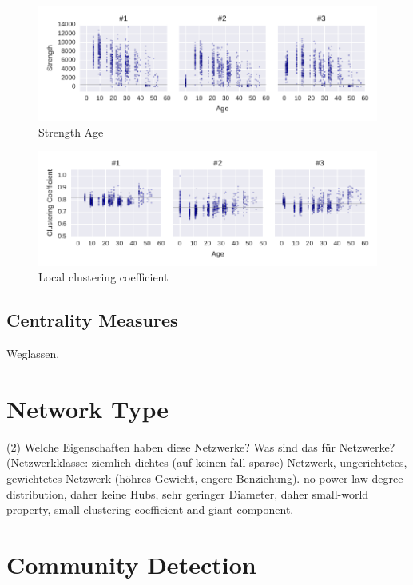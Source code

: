 \begin{figure}[htb]
	\centering
	\includegraphics[width=1.0\textwidth]{Figures/stat-strengthAge}
	\caption[Strength Age]{Strength Age}
	\label{fig:strengthAge}
\end{figure}	


\begin{figure}[htb]
	\centering
	\includegraphics[width=1.0\textwidth]{Figures/stat-ccAge}
	\caption[Local clustering coefficient]{Local clustering coefficient}
	\label{fig:ccAge}
\end{figure}	


\subsection{Centrality Measures}
Weglassen.

\section{Network Type}
(2) Welche Eigenschaften haben diese Netzwerke? Was sind das für Netzwerke? (Netzwerkklasse: ziemlich dichtes (auf keinen fall sparse) Netzwerk, ungerichtetes, gewichtetes Netzwerk (höhres Gewicht, engere Benziehung). no power law degree distribution, daher keine Hubs, sehr geringer Diameter, daher small-world property, small clustering coefficient and giant component.\\

\section{Community Detection}

